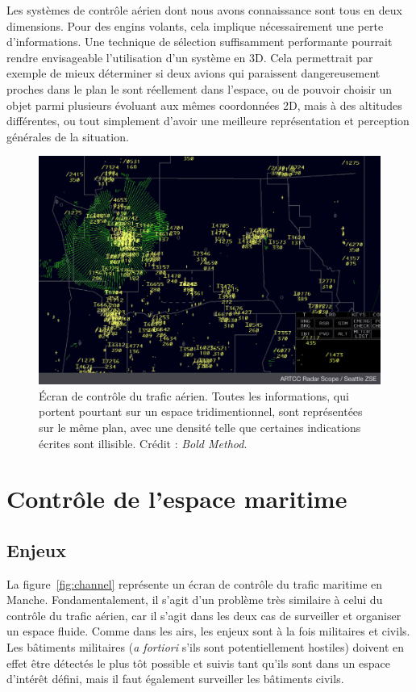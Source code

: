 	Les systèmes de contrôle aérien dont nous avons connaissance sont tous en deux dimensions. Pour des engins volants, cela implique nécessairement une perte d'informations. Une technique de sélection suffisamment performante pourrait rendre envisageable l'utilisation d'un système en 3D. Cela permettrait par exemple de mieux déterminer si deux avions qui paraissent dangereusement proches dans le plan le sont réellement dans l'espace, ou de pouvoir choisir un objet parmi plusieurs évoluant aux mêmes coordonnées 2D, mais à des altitudes différentes, ou tout simplement d'avoir une meilleure représentation et perception générales de la situation.

	\begin{figure}[H]
		\centering
		\includegraphics[width=\textwidth]{figures/Radar-Scope-ZSE}
		\caption{Écran de contrôle du trafic aérien. Toutes les informations, qui portent pourtant sur un espace tridimentionnel, sont représentées sur le même plan, avec une densité telle que certaines indications écrites sont illisible. Crédit : \emph{Bold Method}.}
		\label{fig:airtraffic}
	\end{figure}
	
	\section{Contrôle de l'espace maritime}
	\subsection{Enjeux}
	La figure~\ref{fig:channel} représente un écran de contrôle du trafic maritime en Manche. Fondamentalement, il s'agit d'un problème très similaire à celui du contrôle du trafic aérien, car il s'agit dans les deux cas de surveiller et organiser un espace fluide. Comme dans les airs, les enjeux sont à la fois militaires et civils. Les bâtiments militaires (\emph{a fortiori} s'ils sont potentiellement hostiles) doivent en effet être détectés le plus tôt possible et suivis tant qu'ils sont dans un espace d'intérêt défini, mais il faut également surveiller les bâtiments civils.
	
